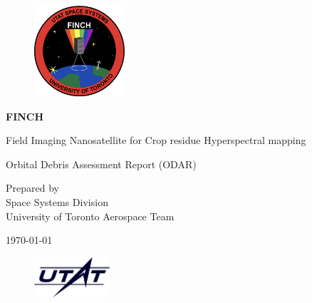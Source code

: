 \begin{titlepage}
    \begin{center}
        \vspace*{1cm}

        \begin{figure}[H]
            \centering
            \includegraphics[width=0.3\textwidth]{figures/logos/finch-patch.png}
        \end{figure}

        \begin{figure}[H]
            \centering
            
        \end{figure}

        {\Huge\textbf{FINCH}}

        \bigskip
        \bigskip

        {\LARGE Field Imaging Nanosatellite for Crop residue Hyperspectral mapping}

        \bigskip
        \bigskip
        \bigskip

        {\Large  Orbital Debris Assessment Report (ODAR) \\}

        \vfill

        {\normalsize Prepared by \\
            Space Systems Division \\
            University of Toronto Aerospace Team \\}

        \bigskip
        \bigskip
        \bigskip

        {\Large \today}

        \begin{figure}[H]
            \centering
            \includegraphics[trim={0 0 0 0}, clip, width=0.25\textwidth]{figures/logos/utat.png}
            \label{fig:logo}
        \end{figure}

    \end{center}
\end{titlepage}